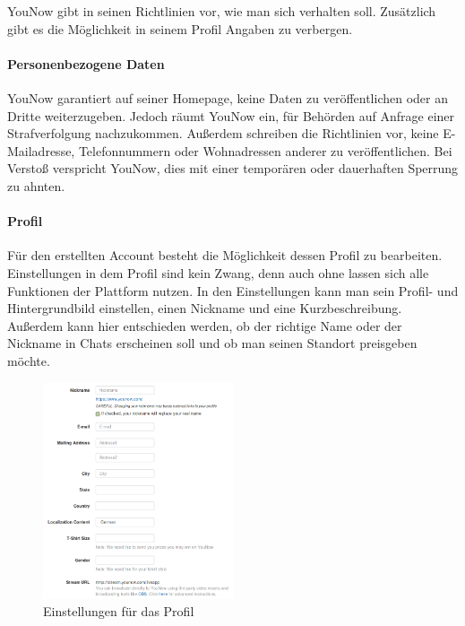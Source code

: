 YouNow gibt in seinen Richtlinien vor, wie man sich verhalten soll. Zusätzlich gibt es die Möglichkeit in seinem Profil Angaben zu verbergen.

\paragraph{Personenbezogene Daten}
YouNow garantiert auf seiner Homepage, keine Daten zu veröffentlichen oder an Dritte weiterzugeben. Jedoch räumt YouNow ein, für Behörden auf Anfrage einer Strafverfolgung nachzukommen. Außerdem schreiben die Richtlinien vor, keine E-Mailadresse, Telefonnummern oder Wohnadressen anderer zu veröffentlichen. Bei Verstoß verspricht YouNow, dies mit einer temporären oder dauerhaften Sperrung zu ahnten.  

\paragraph{Profil}
Für den erstellten Account besteht die Möglichkeit dessen Profil zu bearbeiten. Einstellungen in dem Profil sind kein Zwang, denn auch ohne lassen sich alle Funktionen der Plattform nutzen. In den Einstellungen kann man sein Profil- und Hintergrundbild einstellen, einen Nickname und eine Kurzbeschreibung. Außerdem kann hier entschieden werden, ob der richtige Name oder der Nickname in Chats erscheinen soll und ob man seinen Standort preisgeben möchte.

\begin{figure}[h!]
\centering
\includegraphics[width=0.5\textwidth]{./resources/younow_profile_settings}
\caption{Einstellungen für das Profil}
\label{profil_einstellungen}
\end{figure} 
